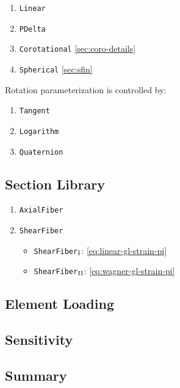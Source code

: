 \begin{enumerate}
    \item[T1.]\label{lib:T1} \texttt{Linear}
    \item[T2.]\label{lib:T2} \texttt{PDelta}
    \item[T3.]\label{lib:T3} \texttt{Corotational} \cref{sec:coro-details}
    \item[T4.]\label{lib:T4} \texttt{Spherical} \cref{sec:sfin}
\end{enumerate}

Rotation parameterization is controlled by:
\begin{enumerate}
    \item[R1.] \texttt{Tangent}
    \item[R2.] \texttt{Logarithm}
    \item[R3.] \texttt{Quaternion}
\end{enumerate}

\subsection{Section Library}

\begin{enumerate}
    \item \texttt{AxialFiber}
    \item \texttt{ShearFiber} 
    \begin{itemize}
        \item \texttt{ShearFiber}$_{\rm I}$:  \eqref{eq:linear-gl-strain-pi}
        \item \texttt{ShearFiber}$_{\rm II}$: \eqref{eq:wagner-gl-strain-pi}
    \end{itemize}
\end{enumerate}


\subsection{Element Loading}\label{sec:loading}


\subsection{Sensitivity}
\cite{al-aukaily2019corotational}

\subsection{Summary}

